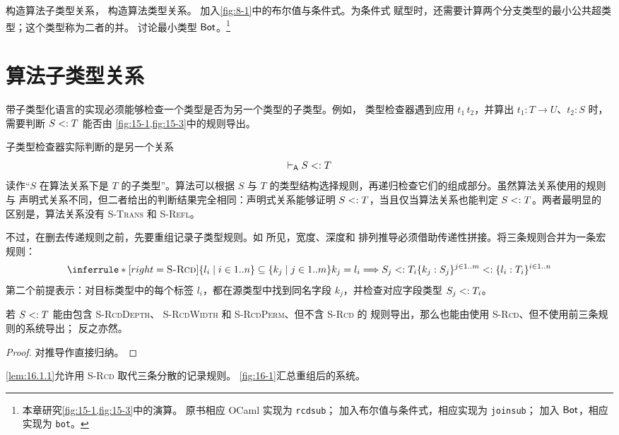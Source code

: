 构造算法子类型关系，
构造算法类型关系。
加入\cref{fig:8-1}中的布尔值与条件式。为条件式
赋型时，还需要计算两个分支类型的最小公共超类型；这个类型称为二者的并。
讨论最小类型
\(\mathsf{Bot}\)。\footnote{本章研究\cref{fig:15-1,fig:15-3}中的演算。
原书相应 OCaml 实现为 \texttt{rcdsub}；
加入布尔值与条件式，相应实现为 \texttt{joinsub}；
加入 \(\mathsf{Bot}\)，相应实现为
\texttt{bot}。}

\section{算法子类型关系}
\label{sec:16.1}

带子类型化语言的实现必须能够检查一个类型是否为另一个类型的子类型。例如，
类型检查器遇到应用 \(t_1\,t_2\)，并算出
\(t_1:T\to U\)、\(t_2:S\) 时，需要判断 \(S\mathrel{<:} T\) 能否由
\cref{fig:15-1,fig:15-3}中的规则导出。

子类型检查器实际判断的是另一个关系
\[
  \mathrel{\vdash_{\mathsf A}} S\mathrel{<:} T
\]
读作“\(S\) 在算法关系下是 \(T\) 的子类型”。算法可以根据 \(S\) 与 \(T\)
的类型结构选择规则，再递归检查它们的组成部分。虽然算法关系使用的规则与
声明式关系不同，但二者给出的判断结果完全相同：声明式关系能够证明
\(S\mathrel{<:} T\)，当且仅当算法关系也能判定 \(S\mathrel{<:} T\)。两者最明显的
区别是，算法关系没有 \textsc{S-Trans} 和 \textsc{S-Refl}。

不过，在删去传递规则之前，先要重组记录子类型规则。如
所见，宽度、深度和
排列推导必须借助传递性拼接。将三条规则合并为一条宏规则：
\[
\inferrule*[right=\textsc{S-Rcd}]
 {\{l_i\mid i\in1..n\}\subseteq\{k_j\mid j\in1..m\}\\
  k_j=l_i\Longrightarrow S_j\subtype T_i}
 {\{k_j:S_j\}^{j\in1..m}\subtype
  \{l_i:T_i\}^{i\in1..n}}
\]
第二个前提表示：对目标类型中的每个标签 \(l_i\)，都在源类型中找到同名字段
\(k_j\)，并检查对应字段类型 \(S_j\mathrel{<:} T_i\)。

\begin{lemma}
\label{lem:16.1.1}
若 \(S\mathrel{<:} T\) 能由包含 \textsc{S-RcdDepth}、
\textsc{S-RcdWidth} 和 \textsc{S-RcdPerm}、但不含 \textsc{S-Rcd} 的
规则导出，那么也能由使用 \textsc{S-Rcd}、但不使用前三条规则的系统导出；
反之亦然。
\end{lemma}
\begin{proof}
对推导作直接归纳。
\end{proof}

\cref{lem:16.1.1}允许用 \textsc{S-Rcd} 取代三条分散的记录规则。
\cref{fig:16-1}汇总重组后的系统。

